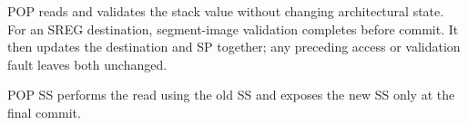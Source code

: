 POP reads and validates the stack value without changing architectural state. For an SREG destination, segment-image
validation completes before commit. It then updates the destination and SP together; any preceding access or
validation fault leaves both unchanged.

POP SS performs the read using the old SS and exposes the new SS only at the final commit.
